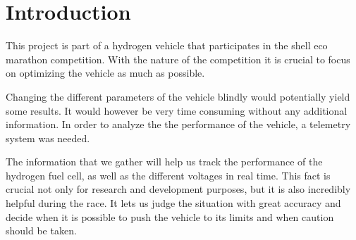 \clearpage
\section{Introduction}

This project is part of a hydrogen vehicle that participates in the shell eco
marathon competition. With the nature of the competition it is crucial to focus
on optimizing the vehicle as much as possible.

Changing the different parameters of the vehicle blindly would potentially
yield some results. It would however be very time consuming without any
additional information. In order to analyze the the performance of the vehicle,
a telemetry system was needed.

The information that we gather will help us track the performance of the
hydrogen fuel cell, as well as the different voltages in real time. This fact
is crucial not only for research and development purposes, but it is also
incredibly helpful during the race. It lets us judge the situation with great
accuracy and decide when it is possible to push the vehicle to its limits and
when caution should be taken.

